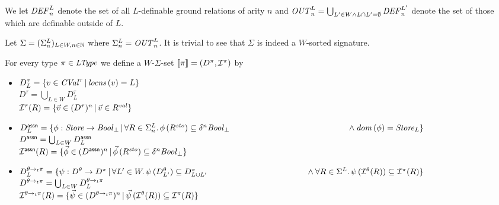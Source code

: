 \documentclass[12pt,a4paper]{report}
\newcommand{\CVal}{\nstyle{CVal}}
\newcommand{\sto}{\nstyle{sto}}
\newcommand{\val}{\nstyle{val}}
\newcommand{\DEF}{\nstyle{DEF}}
\newcommand{\OUT}{\nstyle{OUT}}
\newcommand{\I}{\mathcal{I}}
\begin{document}
We let $\DEF^L_n$ denote the set of all $L$-definable ground relations
of arity $n$ and $\OUT^L_n = \bigcup_{L'\in W\wedge L \cap L' = \emptyset} \DEF^{L'}_n$ denote
the set of those which are definable outside of $L$.

Let $\Sigma = (\Sigma^L_n)_{L\in W,n\in \mathbb N}$ where $\Sigma^L_n = \OUT^L_n$. It is trivial to see
that $\Sigma$ is indeed a $W$-sorted signature.

\begin{definition}
  For every type $\pi\in\mathit{LType}$ we define a $W$-$\Sigma$-set $\semantic{\pi}=(D^\pi,\I^\pi)$ by
  \begin{itemize}
    \item $D^\tau_L = \{v\in\CVal^\tau\,|\,\locns{v} = L\}$ \\
          $D^\tau = \bigcup_{L\in W} D^\tau_L$ \\
          $\I^\tau(R) = \{\vec{v}\in(D^\tau)^n\,|\,\vec{v}\in R^\val\}$

    \item $D^\tassn_L = \{ \phi:\Store\to\Bool_\bot\,|\,
                              \forall R\in\Sigma^L_n.\,\phi\,(R^\sto) \subseteq \delta^n\Bool_\bot \\
                              \hspace*{5cm} \wedge \dom{\phi} = \Store_L
                         \}$ \\
          $D^{\mathsf{assn}} = \bigcup_{L\in W} D^{\mathsf{assn}}_L$ \\
          $\I^\tassn(R) = \{ \vec{\phi} \in (D^\tassn)^n\,|\,
                                  \vec{\phi}\,(R^\sto) \subseteq \delta^n \Bool_\bot \}$

    \item $D^{\ttarrow{\theta}{\pi}}_L = \{ \psi:D^\theta \to D^\pi\,|\,
                              \forall L'\in W.\, \psi\,(D^\theta_{L'}) \subseteq D^\pi_{L \cup L'} \\
                              \hspace*{4.2cm} \wedge \forall R\in\Sigma^L.\, \psi\,(\I^\theta(R))\subseteq\I^\pi(R)\}$ \\
          $D^{\theta\rightarrow_t\pi} = \bigcup_{L\in W} D^{\theta\rightarrow_t\pi}_L$ \\
          $\I^{\ttarrow{\theta}{\pi}}(R) = \{ \vec{\psi} \in (D^{\ttarrow{\theta}{\pi}})^n\,|\,
                                          \vec{\psi}\,(\I^\theta(R)) \subseteq \I^\pi(R) \}$
  \end{itemize}
\end{definition}
\end{document}
